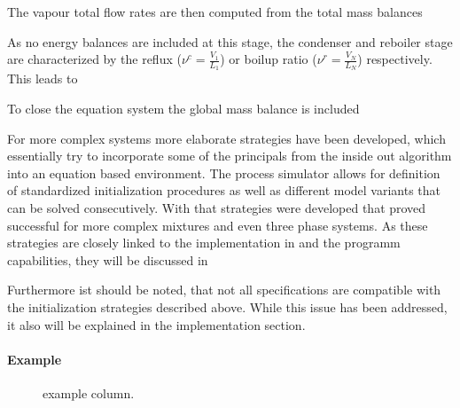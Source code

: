         The vapour total flow rates are then computed from the total mass balances

        As no energy balances are included at this stage, the condenser and reboiler stage
        are characterized by the reflux ($\nu^c = \frac{V_1}{L_1}$) or boilup ratio
        ($\nu^r = \frac{V_N}{L_N}$) respectively. This leads to

        To close the equation system the global mass balance is included

        For more complex systems more elaborate strategies have been developed, which essentially try
        to incorporate some of the principals from the inside out algorithm into an equation based
        environment. The process simulator \gproms allows for definition of standardized initialization
        procedures as well as different model variants that can be solved consecutively. With that strategies
        were developed that proved successful for more complex mixtures and even three phase systems. As
        these strategies are closely linked to the implementation in \gproms and the programm
        capabilities, they will be discussed in 

        Furthermore ist should be noted, that not all specifications are compatible with the initialization
        strategies described above. While this issue has been addressed, it also will be explained in the
        implementation section.

        \paragraph{Example}

        \begin{figure}
            \begin{minipage}{0.25\textwidth}
                
                \caption{example column.}
                \label{fig:lpc_example}
            \end{minipage}
            \begin{minipage}{0.73\textwidth}
                \raisebox{\depth}{\footnotesize}
                \label{fig:lpc_example}
            \end{minipage}
        \end{figure}

